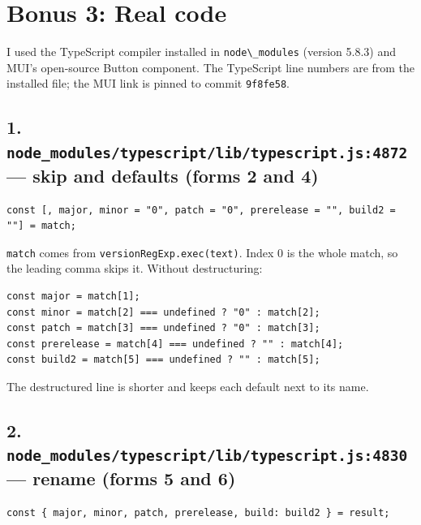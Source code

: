 \documentclass[
  11pt,
]{article}
\begin{document}
\section{Bonus 3: Real code}\label{bonus-3-real-code}

I used the TypeScript compiler installed in
\texttt{node\textbackslash{}\_modules} (version 5.8.3) and MUI's
open-source Button component. The TypeScript line numbers are from the
installed file; the MUI link is pinned to commit
\texttt{9f8fe58}.

\subsection{\texorpdfstring{1.
\texttt{node\_modules/typescript/lib/typescript.js:4872} --- skip and
defaults (forms 2 and
4)}{1. node\_modules/typescript/lib/typescript.js:4872 --- skip and defaults (forms 2 and 4)}}\label{node_modulestypescriptlibtypescript.js4872-skip-and-defaults-forms-2-and-4}

\begin{lstlisting}
const [, major, minor = "0", patch = "0", prerelease = "", build2 = ""] = match;
\end{lstlisting}

\texttt{match} comes from
\texttt{versionRegExp.exec(text)}. Index 0 is the whole
match, so the leading comma skips it. Without destructuring:

\begin{lstlisting}
const major = match[1];
const minor = match[2] === undefined ? "0" : match[2];
const patch = match[3] === undefined ? "0" : match[3];
const prerelease = match[4] === undefined ? "" : match[4];
const build2 = match[5] === undefined ? "" : match[5];
\end{lstlisting}

The destructured line is shorter and keeps each default next to its
name.

\subsection{\texorpdfstring{2.
\texttt{node\_modules/typescript/lib/typescript.js:4830} --- rename
(forms 5 and
6)}{2. node\_modules/typescript/lib/typescript.js:4830 --- rename (forms 5 and 6)}}\label{node_modulestypescriptlibtypescript.js4830-rename-forms-5-and-6}

\begin{lstlisting}
const { major, minor, patch, prerelease, build: build2 } = result;
\end{lstlisting}
\end{document}
